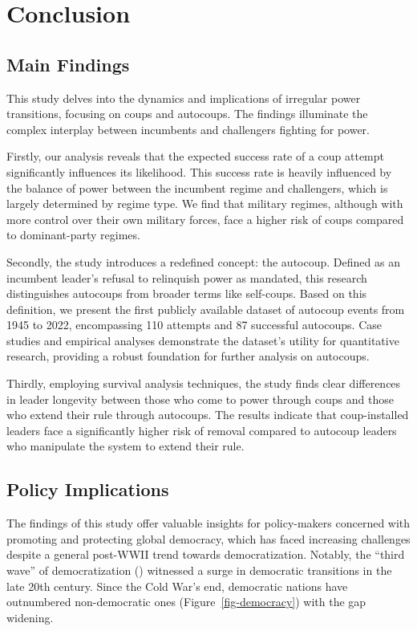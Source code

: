 \documentclass[
  12pt,
]{report}
\begin{document}
\chapter{Conclusion}\label{conclusion-1}

\section{Main Findings}\label{main-findings}

This study delves into the dynamics and implications of irregular power
transitions, focusing on coups and autocoups. The findings illuminate
the complex interplay between incumbents and challengers fighting for
power.

Firstly, our analysis reveals that the expected success rate of a coup
attempt significantly influences its likelihood. This success rate is
heavily influenced by the balance of power between the incumbent regime
and challengers, which is largely determined by regime type. We find
that military regimes, although with more control over their own
military forces, face a higher risk of coups compared to dominant-party
regimes.

Secondly, the study introduces a redefined concept: the autocoup.
Defined as an incumbent leader's refusal to relinquish power as
mandated, this research distinguishes autocoups from broader terms like
self-coups. Based on this definition, we present the first publicly
available dataset of autocoup events from 1945 to 2022, encompassing 110
attempts and 87 successful autocoups. Case studies and empirical
analyses demonstrate the dataset's utility for quantitative research,
providing a robust foundation for further analysis on autocoups.

Thirdly, employing survival analysis techniques, the study finds clear
differences in leader longevity between those who come to power through
coups and those who extend their rule through autocoups. The results
indicate that coup-installed leaders face a significantly higher risk of
removal compared to autocoup leaders who manipulate the system to extend
their rule.

\section{Policy Implications}\label{policy-implications}

The findings of this study offer valuable insights for policy-makers
concerned with promoting and protecting global democracy, which has
faced increasing challenges despite a general post-WWII trend towards
democratization. Notably, the ``third wave'' of democratization
()
witnessed a surge in democratic transitions in the late 20th century.
Since the Cold War's end, democratic nations have outnumbered
non-democratic ones (Figure~\ref{fig-democracy}) with the gap widening.
\end{document}
